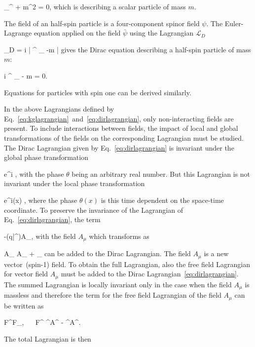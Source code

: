 {
 \partial_{\mu}\partial^{\mu} \phi + m^{2} \phi = 0,
}
which is describing a scalar particle of mass $m$. 

The field of an half-spin particle is a four-component spinor field $\psi$. The Euler-Lagrange equation applied on the field $\bar{\psi}$ using the Lagrangian $\mathcal{L}_{D}$


{
 _{D} = i \bar{\psi} \gamma^{\mu} \partial_{\mu} \psi -m \bar{\psi} \psi
}
gives the Dirac equation describing a half-spin particle of mass $m$:

{
  i \gamma^{\mu} \partial_{\mu} \psi - m \psi = 0.
}

Equations for particles with spin one can be derived similarly.

In the above Lagrangians defined by Eq.~\ref{eq:kglagrangian}~and~\ref{eq:dirlagrangian}, only non-interacting fields are present. To include interactions between fields, the impact of local and global transformations of the fields on the corresponding Lagrangian must be studied. The Dirac Lagrangian given by Eq.~\ref{eq:dirlagrangian} is invariant under the global phase transformation

{
\psi \to e^{i\theta} \psi, 
}
with the phase $\theta$ being an arbitrary real number. But this Lagrangian is not invariant under the local phase transformation 

{
\psi \to e^{i\theta (x)} \psi,
}
where the phase $\theta(x)$ is this time dependent on the space-time coordinate. To preserve the invariance of the Lagrangian of Eq.~\ref{eq:dirlagrangian}, the term 

{
-(q\bar{\psi}\gamma^{\mu}\psi)A_{\mu}, 
}
with the field $A_{\mu}$ which transforms as 

{
A_{\mu} \to A_{\mu} + \partial_{\mu} \lambda
}
can be added to the Dirac Lagrangian. The field $A_{\mu}$ is a new vector~(spin-1) field. To obtain the full Lagrangian, also the free field Lagrangian for vector field $A_{\mu}$ must be added to the Dirac Lagrangian~\ref{eq:dirlagrangian}. The summed Lagrangian is locally invariant only in the case when the field $A_{\mu}$ is massless and therefore the term for the free field Lagrangian of the field $A_{\mu}$ can be written as

{
    F^{\mu\nu}F_{\mu\nu}, ~~ F^{\mu\nu} \equiv \partial^{\mu}A^{\nu} - \partial^{\nu}A^{\mu}.
} 

The total Lagrangian is then

